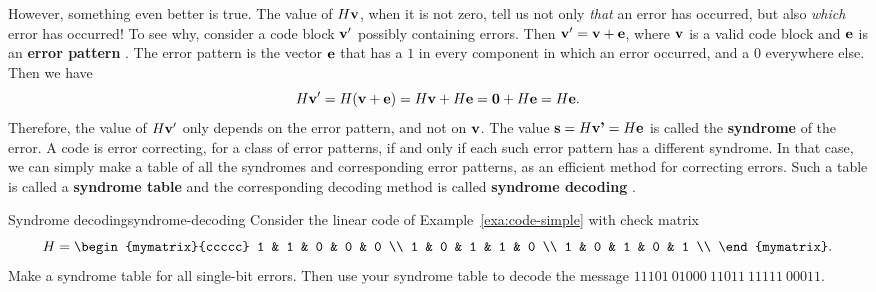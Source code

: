 However, something even better is true. The value of $H\mbox{\bf v}$, when
it is not zero, tell us not only {\em that} an error has occurred, but
also {\em which} error has occurred! To see why, consider a code block
$\mbox{\bf v}'$ possibly containing errors. Then
$\mbox{\bf v}' = \mbox{\bf v} + \mbox{\bf e}$, where $\mbox{\bf v}$ is a valid code
block and $\mbox{\bf e}$ is an \textbf{error pattern}%
%
%
. The error pattern is the vector
$\mbox{\bf e}$ that has a $1$ in every component in which an error
occurred, and a $0$ everywhere else.  Then we have
\begin{equation*}
  H\mbox{\bf v}' = H(\mbox{\bf v} + \mbox{\bf e}) = H\mbox{\bf v} + H\mbox{\bf e} =
  \mbox{\bf 0} + H\mbox{\bf e} = H\mbox{\bf e}.
\end{equation*}
Therefore, the value of $H\mbox{\bf v}'$ only depends on the error
pattern, and not on $\mbox{\bf v}$. The value
$\mbox{\bf s} = H\mbox{\bf v'} = H\mbox{\bf e}$ is called the \textbf{syndrome}%
%
%
 of the error. A code is error correcting,
for a class of error patterns, if and only if each such error pattern
has a different syndrome. In that case, we can simply make a table of
all the syndromes and corresponding error patterns, as an efficient
method for correcting errors. Such a table is called a
\textbf{syndrome table}%
%
%
 and the corresponding decoding
method is called \textbf{syndrome decoding}%
%
%
.

\begin{example}{Syndrome decoding}{syndrome-decoding}
  Consider the linear code of Example~\ref{exa:code-simple} with check
  matrix
  \begin{equation*}
    H = \begin{mymatrix}{ccccc}
      1 & 1 & 0 & 0 & 0 \\
      1 & 0 & 1 & 1 & 0 \\
      1 & 0 & 1 & 0 & 1 \\
    \end{mymatrix}.
  \end{equation*}
  Make a syndrome table for all single-bit errors.  Then use your
  syndrome table to decode the message
  $11101~01000~11011~11111~00011$.
\end{example}

